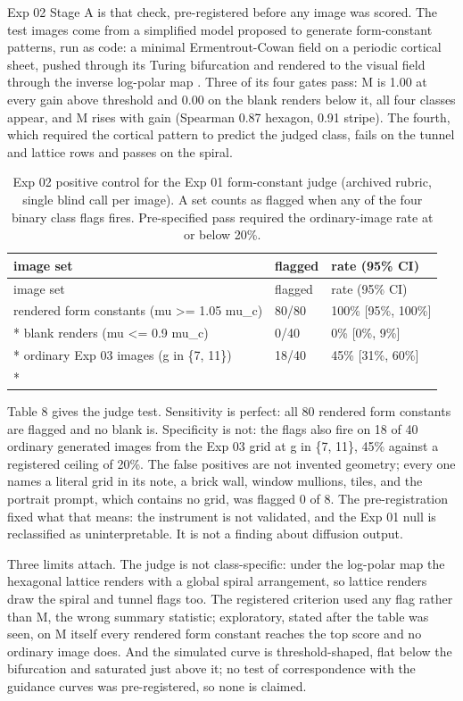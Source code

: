 \documentclass[11pt]{article}
\begin{document}
Exp 02 Stage A is that check, pre-registered before any image was scored. The
test images come from a simplified model proposed to generate form-constant
patterns, run as code: a minimal Ermentrout-Cowan field on a periodic cortical
sheet, pushed through its Turing bifurcation and rendered to the visual field
through the inverse log-polar map \citep{ermentrout1979}. Three of its four
gates pass: M is 1.00 at every gain above threshold and 0.00 on the blank
renders below it, all four classes appear, and M rises with gain (Spearman 0.87
hexagon, 0.91 stripe). The fourth, which required the cortical pattern to
predict the judged class, fails on the tunnel and lattice rows and passes on the
spiral.

\begin{longtable}[]{@{}lll@{}}
\caption{Exp 02 positive control for the Exp 01 form-constant judge (archived
rubric, single blind call per image). A set counts as flagged when any of the
four binary class flags fires. Pre-specified pass required the ordinary-image
rate at or below 20\%.}\tabularnewline
\toprule\noalign{}
image set & flagged & rate (95\% CI) \\
\midrule\noalign{}
\endfirsthead
\toprule\noalign{}
image set & flagged & rate (95\% CI) \\
\midrule\noalign{}
\endhead
\bottomrule\noalign{}
\endlastfoot
rendered form constants (mu \textgreater= 1.05 mu\_c) & 80/80 & 100\% {[}95\%,
100\%{]} \\*
blank renders (mu \textless= 0.9 mu\_c) & 0/40 & 0\% {[}0\%, 9\%{]} \\*
ordinary Exp 03 images (g in \{7, 11\}) & 18/40 & 45\% {[}31\%, 60\%{]} \\*
\end{longtable}

Table 8 gives the judge test. Sensitivity is perfect: all 80 rendered form
constants are flagged and no blank is. Specificity is not: the flags also fire
on 18 of 40 ordinary generated images from the Exp 03 grid at g in \{7, 11\},
45\% against a registered ceiling of 20\%. The false positives are not invented
geometry; every one names a literal grid in its note, a brick wall, window
mullions, tiles, and the portrait prompt, which contains no grid, was flagged 0
of 8. The pre-registration fixed what that means: the instrument is not
validated, and the Exp 01 null is reclassified as uninterpretable. It is not a
finding about diffusion output.

Three limits attach. The judge is not class-specific: under the log-polar map
the hexagonal lattice renders with a global spiral arrangement, so lattice
renders draw the spiral and tunnel flags too. The registered criterion used any
flag rather than M, the wrong summary statistic; exploratory, stated after the
table was seen, on M itself every rendered form constant reaches the top score
and no ordinary image does. And the simulated curve is threshold-shaped, flat
below the bifurcation and saturated just above it; no test of correspondence
with the guidance curves was pre-registered, so none is claimed.
\end{document}
